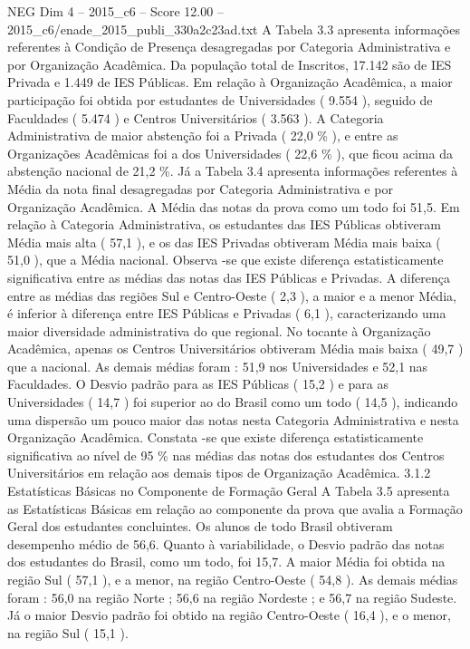 \begin{textsample}{NEG Dim 4 – 2015\_c6 – Score 12.00 – 2015\_c6/enade\_2015\_publi\_330a2c23ad.txt}
A Tabela 3.3 apresenta informações referentes à Condição de Presença desagregadas por Categoria Administrativa e por Organização Acadêmica.
Da população total de Inscritos, 17.142 são de IES Privada e 1.449 de IES Públicas.
Em relação à Organização Acadêmica, a maior participação foi obtida por estudantes de Universidades ( 9.554 ), seguido de Faculdades ( 5.474 ) e Centros Universitários ( 3.563 ).
A Categoria Administrativa de maior abstenção foi a Privada ( 22,0 \% ), e entre as Organizações Acadêmicas foi a dos Universidades ( 22,6 \% ), que ficou acima da abstenção nacional de 21,2 \%.
Já a Tabela 3.4 apresenta informações referentes à Média da nota final desagregadas por Categoria Administrativa e por Organização Acadêmica.
A Média das notas da prova como um todo foi 51,5.
Em relação à Categoria Administrativa, os estudantes das IES Públicas obtiveram Média mais alta ( 57,1 ), e os das IES Privadas obtiveram Média mais baixa ( 51,0 ), que a Média nacional.
Observa -se que existe diferença estatisticamente significativa entre as médias das notas das IES Públicas e Privadas.
A diferença entre as médias das regiões Sul e Centro-Oeste ( 2,3 ), a maior e a menor Média, é inferior à diferença entre IES Públicas e Privadas ( 6,1 ), caracterizando uma maior diversidade administrativa do que regional.
No tocante à Organização Acadêmica, apenas os Centros Universitários obtiveram Média mais baixa ( 49,7 ) que a nacional.
As demais médias foram : 51,9 nos Universidades e 52,1 nas Faculdades.
O Desvio padrão para as IES Públicas ( 15,2 ) e para as Universidades ( 14,7 ) foi superior ao do Brasil como um todo ( 14,5 ), indicando uma dispersão um pouco maior das notas nesta Categoria Administrativa e nesta Organização Acadêmica.
Constata -se que existe diferença estatisticamente significativa ao nível de 95 \% nas médias das notas dos estudantes dos Centros Universitários em relação aos demais tipos de Organização Acadêmica. 3.1.2 Estatísticas Básicas no Componente de Formação Geral A Tabela 3.5 apresenta as Estatísticas Básicas em relação ao componente da prova que avalia a Formação Geral dos estudantes concluintes.
Os alunos de todo Brasil obtiveram desempenho médio de 56,6.
Quanto à variabilidade, o Desvio padrão das notas dos estudantes do Brasil, como um todo, foi 15,7.
A maior Média foi obtida na região Sul ( 57,1 ), e a menor, na região Centro-Oeste ( 54,8 ).
As demais médias foram : 56,0 na região Norte ; 56,6 na região Nordeste ; e 56,7 na região Sudeste.
Já o maior Desvio padrão foi obtido na região Centro-Oeste ( 16,4 ), e o menor, na região Sul ( 15,1 ).

\end{textsample}
